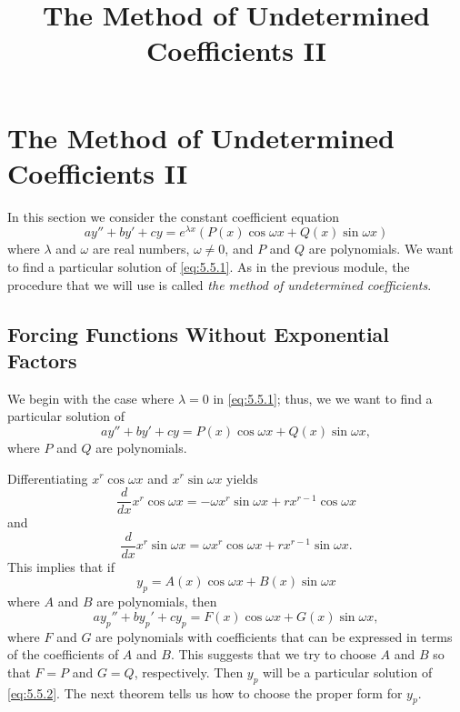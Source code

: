 \documentclass{ximera}
\title{The Method of Undetermined Coefficients II}
\begin{document}
\begin{abstract}

\end{abstract}

\maketitle

\section*{The Method of Undetermined Coefficients II}

In this section we consider the constant coefficient equation
\begin{equation} \label{eq:5.5.1}
ay''+by'+cy=e^{\lambda x}\left(P(x)\cos \omega x+Q(x)\sin \omega x\right)
\end{equation}
where $\lambda$ and $\omega$ are real numbers, $\omega\neq 0$, and $P$
and $Q$ are polynomials. We want to find a particular solution of
\eqref{eq:5.5.1}. As in the previous module, the procedure that we
will use is called \textit{the method of undetermined coefficients}.

\subsection*{Forcing Functions Without Exponential Factors}

We begin with the case where $\lambda=0$ in \eqref{eq:5.5.1};   thus, we
we
want to find a particular solution of
\begin{equation} \label{eq:5.5.2}
ay''+by'+cy=P(x)\cos\omega x+Q(x)\sin\omega x,
\end{equation}
where $P$ and $Q$ are polynomials.

Differentiating  $x^r\cos\omega x$ and $x^r\sin\omega x$ yields
$$
\frac{d}{dx}x^r\cos\omega x=-\omega x^r\sin\omega x+
rx^{r-1}\cos\omega x 
$$
and
$$
\frac{d}{dx}x^r\sin\omega x=\omega x^r\cos\omega x+
rx^{r-1}\sin\omega x.
$$
This implies  that if
$$
y_p=A(x)\cos\omega x+B(x)\sin\omega x
$$
where $A$ and $B$ are polynomials, then
$$
ay_p''+by_p'+cy_p=F(x)\cos\omega x+G(x)\sin\omega x,
$$
where $F$ and $G$ are polynomials with coefficients that can be
expressed in terms of the coefficients of $A$ and $B$. This suggests
that we try to choose $A$ and $B$ so that $F=P$ and $G=Q$,
respectively. Then $y_p$ will be a particular solution of
\eqref{eq:5.5.2}. The next theorem tells us how to choose the proper
form for $y_p$. %
\end{document}
